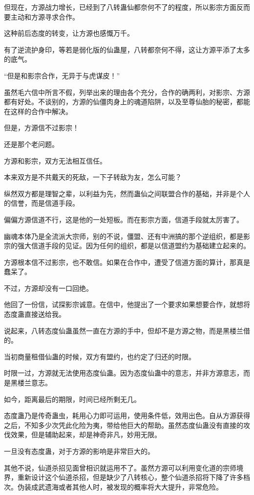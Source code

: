 \begin{this_body}
但现在，方源战力增长，已经到了八转蛊仙都奈何不了的程度，所以影宗方面反而要主动和方源寻求合作。

这种前后态度的转变，让方源也感慨万千。

有了逆流护身印，等若是弱化版的仙蛊屋，八转都奈何不得，这让方源平添了太多的底气。

“但是和影宗合作，无异于与虎谋皮！”

虽然毛六信中所言不假，列举出来的理由各个充分，合作的确两利，对影宗、方源都有好处。不谈别的，方源的仙僵肉身上的魂道陷阱，以及至尊仙胎的秘密，都能在这样的合作中解决。

但是，方源信不过影宗！

还是那个老问题。

方源和影宗，双方无法相互信任。

本来双方是不共戴天的死敌，一下子转敌为友，怎么可能？

纵然双方都是理智之辈，以利益为先，然而蛊仙之间联盟合作的基础，并非是个人的信誉，而是信道手段。

偏偏方源信道不行，这是他的一处短板。而在影宗方面，信道手段就太厉害了。

幽魂本体乃是全流派大宗师，别的不说，僵盟、还有中洲搞的那个逆组织，都是影宗的强大信道手段的见证。因为任何的组织，都是以信道盟约为基础建立起来的。

方源根本信不过影宗，也不敢信。如果在合作中，遭受了信道方面的算计，那真是蠢呆了。

不过，方源却没有一口回绝。

他回了一份信，试探影宗诚意。在信中，他提出了一个要求如果想要合作，就想将态度蛊直接送给我。

说起来，八转态度仙蛊虽然一直在方源的手中，但却不是方源之物，而是黑楼兰借的。

当初商量租借仙蛊的时候，双方有盟约，也约定了归还的时限。

时限一过，方源就无法使用态度仙蛊。因为态度仙蛊中的意志，并非方源意志，而是黑楼兰意志。

如今，距离最后的期限，时间已经所剩无几。

态度蛊乃是传奇蛊虫，耗用心力即可运用，使用条件低，效用出色。自从方源获得之后，不知多少次凭此化险为夷，带给他巨大的帮助。虽然态度仙蛊没有直接的攻伐效果，但是辅助起来，却是神奇非凡，妙用无限。

一旦没有态度蛊，对于方源的影响是非常巨大的。

其他不说，仙道杀招见面曾相识就运用不了。虽然方源可以利用变化道的宗师境界，重新设计这个仙道杀招，但是缺少了八转核心，整个仙道杀招将下降了许多档次。伪装成武遗海或者其他人时，被发现的概率将大大提升，非常危险。


\end{this_body}
